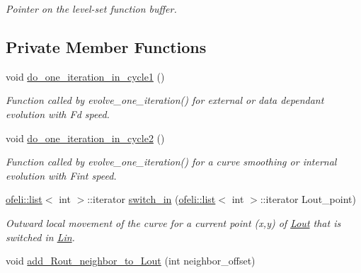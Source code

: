 \begin{DoxyCompactItemize}
\begin{DoxyCompactList}\small\item\em Pointer on the level-\/set function buffer. \end{DoxyCompactList}\end{DoxyCompactItemize}
\subsection*{Private Member Functions}
\begin{DoxyCompactItemize}
\item 
\hypertarget{classofeli_1_1_active_contour_a2ab521c583572158549d416ccc755f3a}{void \hyperlink{classofeli_1_1_active_contour_a2ab521c583572158549d416ccc755f3a}{do\-\_\-one\-\_\-iteration\-\_\-in\-\_\-cycle1} ()}\label{classofeli_1_1_active_contour_a2ab521c583572158549d416ccc755f3a}

\begin{DoxyCompactList}\small\item\em Function called by evolve\-\_\-one\-\_\-iteration() for external or data dependant evolution with {\itshape Fd} speed. \end{DoxyCompactList}\item 
\hypertarget{classofeli_1_1_active_contour_a7cf8243140d8ef8f72a638e9a1442dc2}{void \hyperlink{classofeli_1_1_active_contour_a7cf8243140d8ef8f72a638e9a1442dc2}{do\-\_\-one\-\_\-iteration\-\_\-in\-\_\-cycle2} ()}\label{classofeli_1_1_active_contour_a7cf8243140d8ef8f72a638e9a1442dc2}

\begin{DoxyCompactList}\small\item\em Function called by evolve\-\_\-one\-\_\-iteration() for a curve smoothing or internal evolution with {\itshape Fint} speed. \end{DoxyCompactList}\item 
\hyperlink{classofeli_1_1list}{ofeli\-::list}$<$ int $>$\-::iterator \hyperlink{classofeli_1_1_active_contour_a7d9a557b580af708155ff4ab8bbfd73b}{switch\-\_\-in} (\hyperlink{classofeli_1_1list}{ofeli\-::list}$<$ int $>$\-::iterator Lout\-\_\-point)
\begin{DoxyCompactList}\small\item\em Outward local movement of the curve for a current point ({\itshape x},{\itshape y}) of \hyperlink{classofeli_1_1_active_contour_a31e0eb18a7ea6ae90acf66ed018fcd85}{Lout} that is switched in \hyperlink{classofeli_1_1_active_contour_a7662d4f5c8b87d3e642b08b7e341bd79}{Lin}. \end{DoxyCompactList}\item 
\hypertarget{classofeli_1_1_active_contour_a956318f175100333c4b98aba9253d54a}{void \hyperlink{classofeli_1_1_active_contour_a956318f175100333c4b98aba9253d54a}{add\-\_\-\-Rout\-\_\-neighbor\-\_\-to\-\_\-\-Lout} (int neighbor\-\_\-offset)}\label{classofeli_1_1_active_contour_a956318f175100333c4b98aba9253d54a}


\end{DoxyCompactItemize}
